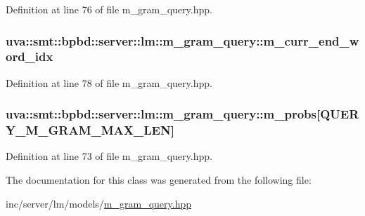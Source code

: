 Definition at line 76 of file m\+\_\+gram\+\_\+query.\+hpp.

\hypertarget{classuva_1_1smt_1_1bpbd_1_1server_1_1lm_1_1m__gram__query_a42e3f70122bd9679f69633fd18cbe903}{}
\subsubsection[{m\+\_\+curr\+\_\+end\+\_\+word\+\_\+idx}]{ uva\+::smt\+::bpbd\+::server\+::lm\+::m\+\_\+gram\+\_\+query\+::m\+\_\+curr\+\_\+end\+\_\+word\+\_\+idx}\label{classuva_1_1smt_1_1bpbd_1_1server_1_1lm_1_1m__gram__query_a42e3f70122bd9679f69633fd18cbe903}


Definition at line 78 of file m\+\_\+gram\+\_\+query.\+hpp.

\hypertarget{classuva_1_1smt_1_1bpbd_1_1server_1_1lm_1_1m__gram__query_a8dabf6ade4cacbd47cc60ce068e2e2e5}{}
\subsubsection[{m\+\_\+probs}]{ uva\+::smt\+::bpbd\+::server\+::lm\+::m\+\_\+gram\+\_\+query\+::m\+\_\+probs\mbox{[}Q\+U\+E\+R\+Y\+\_\+\+M\+\_\+\+G\+R\+A\+M\+\_\+\+M\+A\+X\+\_\+\+L\+E\+N\mbox{]}}\label{classuva_1_1smt_1_1bpbd_1_1server_1_1lm_1_1m__gram__query_a8dabf6ade4cacbd47cc60ce068e2e2e5}


Definition at line 73 of file m\+\_\+gram\+\_\+query.\+hpp.



The documentation for this class was generated from the following file\+:\begin{DoxyCompactItemize}
\item 
inc/server/lm/models/\hyperlink{m__gram__query_8hpp}{m\+\_\+gram\+\_\+query.\+hpp}\end{DoxyCompactItemize}
